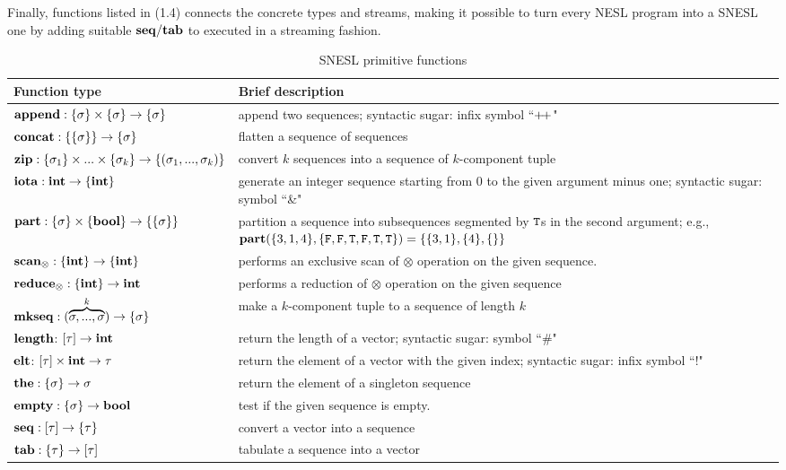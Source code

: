 Finally, functions listed in (1.4) connects the concrete types and streams, making it possible to turn every NESL program into a SNESL one by adding suitable $\mathbf{seq}/\mathbf{tab}$ to executed in a streaming fashion. 

\begin{table}\large
	\renewcommand\arraystretch{1.5}
	\centering
	\begin{tabular}{|p{}|p{}|}
		\hline
		Function type & Brief description  \\ \hline
		$\mathbf{append : \{\sigma\} \times \{\sigma\} \rightarrow \{\sigma\}}$ & append two sequences; syntactic sugar: infix symbol ``${\++}$" \\ \hline
		$\mathbf{concat: \{\{\sigma\}\} \rightarrow \{\sigma\} }$ &  flatten a sequence of sequences                 \\ \hline
		$\mathbf{zip}: \{\sigma_1\} \times ... \times \{\sigma_k\}  \rightarrow \{(\sigma_1,...,\sigma_k)\}$ & convert $k$ sequences into a sequence of $k$-component tuple \\ \hline
		$\mathbf{iota: \mathbf{int} \rightarrow \{\mathbf{int}\}}$  &  generate an integer sequence starting from 0 to the given argument minus one; syntactic sugar: symbol ``\&"    \\ \hline
		$\mathbf{part: \{\sigma\} \times \{\mathbf{bool}\} \rightarrow  \{\{\sigma\}\}}$   & partition a sequence into subsequences segmented by $\mathtt{T}$s in the second argument; e.g., $\mathbf{part}(\{3,1,4\}, \{\mathtt{F},\mathtt{F},\mathtt{T},\mathtt{F},\mathtt{T},\mathtt{T}\}) = \{\{3,1\},\{4\},\{\}\}$                \\ \hline
		$\mathbf{scan_\otimes}: \{\mathbf{int}\} \rightarrow \{\mathbf{int}\}$     &  performs an exclusive scan of $\otimes$ operation on the given sequence.    \\ \hline
		$\mathbf{reduce_\otimes: \{\mathbf{int}\} \rightarrow \mathbf{int} }$     &   performs a reduction of $\otimes$ operation on the given sequence             \\ \hline
		$\mathbf{mkseq}: (\overbrace{\sigma,...,\sigma}^{k}) \rightarrow \{\sigma\}$  & make a $k$-component tuple to a sequence of length $k$ \\ \hline  
	    $\mathbf{length}$: $[\tau] \rightarrow \mathbf{int}$ & return the length of a vector; syntactic sugar: symbol ``\#" \\ \hline  
	    $\mathbf{elt}$: $[\tau] \times \mathbf{int} \rightarrow \tau$  & return the  element of a vector with the given index; syntactic sugar: infix symbol ``!" \\ \hline  
	    $\mathbf{the:  \{\sigma\} \rightarrow \sigma}$     &     return the element of a singleton sequence           \\ \hline
	    $\mathbf{empty:  \{\sigma\} \rightarrow \mathbf{bool}}$       & test if the given sequence is empty.             \\ \hline  
	    $\mathbf{seq}: [\tau] \rightarrow \{\tau\} $  & convert a vector into a sequence \\ \hline  
	    $\mathbf{tab}: \{\tau\} \rightarrow [\tau] $  & tabulate a sequence into a vector\\ \hline  
	\end{tabular}
	\caption{SNESL primitive functions}
	\label{tab:snesl-funcs}
\end{table}




